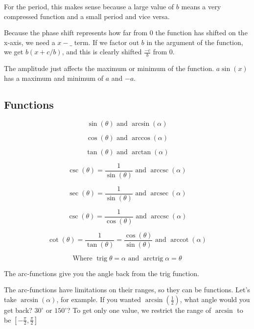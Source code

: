\documentclass{article}
\DeclareMathOperator{\arcsec}{arcsec}
\DeclareMathOperator{\arccot}{arccot}
\DeclareMathOperator{\arccsc}{arccsc}
\DeclareMathOperator{\trig}{trig}
\DeclareMathOperator{\arctrig}{arctrig}
\begin{document}
\vspace{5mm}
\noindent For the period, this makes sense because a large value of $b$ means a very compressed function and a small period and vice versa.

\vspace{5mm}
\noindent Because the phase shift represents how far from 0 the function has shifted on the x-axis, we need a $x-\_$ term. If we factor out $b$ in the argument of the function, we get $b(x+c/b)$, and this is clearly shifted $\frac{-c}{b}$ from 0. 

\vspace{5mm}
\noindent The amplitude just affects the maximum or minimum of the function. $a\sin(x)$ has a maximum and minimum of $a$ and $-a$.

\pagebreak
\subsection{Functions}
\begin{definition}

$$\sin(\theta) \textrm{ and } \arcsin(\alpha)$$


$$\cos(\theta) \textrm{ and } \arccos(\alpha)$$


$$\tan(\theta) \textrm{ and } \arctan(\alpha)$$


$$\csc(\theta) = \frac{1}{\sin(\theta)} \textrm{ and } \arccsc(\alpha)$$


$$\sec{}(\theta) = \frac{1}{\sin(\theta)} \textrm{ and } \arcsec(\alpha)$$


$$\csc(\theta) = \frac{1}{\cos(\theta)} \textrm{ and } \arccsc(\alpha)$$


$$\cot(\theta) = \frac{1}{\tan(\theta)} = \frac{\cos(\theta)}{\sin(\theta)} \textrm{ and } \arccot(\alpha)$$



$$\textrm{Where } \trig{\theta} = \alpha \textrm{ and } \arctrig{\alpha} = \theta$$

\end{definition}

\noindent The arc-functions give you the angle back from the trig function.

\vspace{5mm}
\noindent The arc-functions have limitations on their ranges, so they can be functions. Let's take $\arcsin(\alpha)$, for example. If you wanted $\arcsin(\frac{1}{2})$, what angle would you get back? $30^{\circ}$ or $150^{\circ}$? To get only one value, we restrict the range of $\arcsin$ to be $[-\frac{\pi}{2},\frac{\pi}{2}]$
\end{document}
